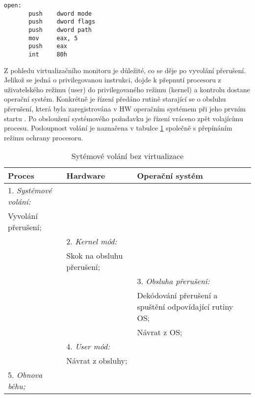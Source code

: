 \begin{lstlisting}[language={[x86masm]Assembler},caption={Systémové volání na FreeBSD},label={code:syscall}]
open:
       push    dword mode
       push    dword flags
       push    dword path
       mov     eax, 5
       push    eax
       int     80h
\end{lstlisting}

Z pohledu virtualizačního monitoru je důležité, co se děje po vyvolání přerušení. Jelikož se jedná o privilegovanou instrukci, dojde k přepnutí procesoru z uživatelského režimu (user) do privilegovaného režimu (kernel) a kontrolu dostane operační systém.
Konkrétně je řízení předáno rutině starající se o obsluhu přerušení, která byla zaregistrována v HW operačním systémem při jeho prvním startu \cite{vmm_book}. Po obsloužení systémového požadavku je řízení vráceno zpět volajícímu procesu.
Posloupnost volání je naznačena v tabulce \ref{table:syscall_nonvirt} společně s přepínáním režimu ochrany procesoru.

\begin{table}
    \centering        
    \begin{tabularx}{\textwidth}{XXX}
    Proces & Hardware & Operační systém \\
    \hline    
    1. \textit{Systémové volání:} && \\ Vyvolání přerušení; && \\
    & 2. \textit{Kernel mód:} & \\ & Skok na obsluhu přerušení; & \\
    && 3. \textit{Obsluha přerušení:}  \\ && Dekódování přerušení a spuštění odpovídající rutiny OS;\\ && Návrat z OS; \\
    & 4. \textit{User mód:} & \\ & Návrat z obsluhy; & \\
    5. \textit{Obnova běhu;} && \\
    \end{tabularx}
    \caption[Sytémové volání bez virtualizace]{Sytémové volání bez virtualizace \cite{vmm_book}}
    \label{table:syscall_nonvirt}
\end{table}

